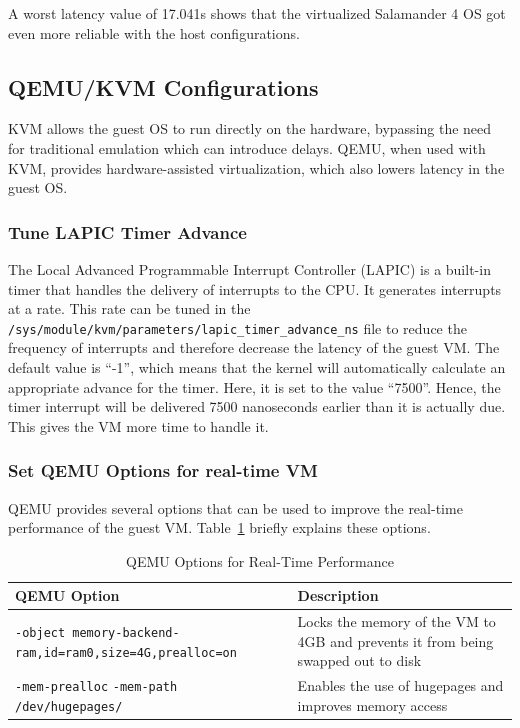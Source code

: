 \documentclass[MMR,Master,english]{twbook}
\begin{document}
\noindent A worst latency value of 17.041\textmu s shows that the virtualized Salamander 4 OS got even more reliable with the host configurations.

\clearpage

\subsection{QEMU/KVM Configurations}\label{subsec:guest_configurations}
KVM allows the guest OS to run directly on the hardware, bypassing the need for traditional emulation which can introduce delays. QEMU, when used with KVM, provides hardware-assisted virtualization, which also lowers latency in the guest OS.

\subsubsection{Tune LAPIC Timer Advance}
The Local Advanced Programmable Interrupt Controller (LAPIC) is a built-in timer that handles the delivery of interrupts to the CPU.
It generates interrupts at a rate. This rate can be tuned in the \texttt{/sys/module/kvm/parameters/lapic\_timer\_advance\_ns} file to reduce the frequency of interrupts and therefore decrease the latency of the guest VM. The default value is ``-1'', which means that the kernel will automatically calculate an appropriate advance for the timer. Here, it is set to the value ``7500''. Hence, the timer interrupt will be delivered 7500 nanoseconds earlier than it is actually due. This gives the VM more time to handle it.

\subsubsection{Set QEMU Options for real-time VM}
QEMU provides several options that can be used to improve the real-time performance of the guest VM. Table~\ref{tab:qemu_options} briefly explains these options.

\begin{table}[H]
	\centering
	\caption{QEMU Options for Real-Time Performance}
	\label{tab:qemu_options}
	\setlength{\tabcolsep}{0.5em} %
	{\renewcommand{\arraystretch}{1.2}%
		\begin{tabular}{|p{6.5cm}|p{8cm}|}
			\hline
			\textbf{QEMU Option}                                                             & \textbf{Description}                                                             \\\hline
			\texttt{-object memory-backend-ram,}\newline\texttt{id=ram0,size=4G,prealloc=on} & Locks the memory of the VM to 4GB and prevents it from being swapped out to disk \\\hline
			\texttt{-mem-prealloc} \newline \texttt{-mem-path /dev/hugepages/}               & Enables the use of hugepages and improves \newline memory access                 \\\hline
		\end{tabular}}
\end{table}
\end{document}
